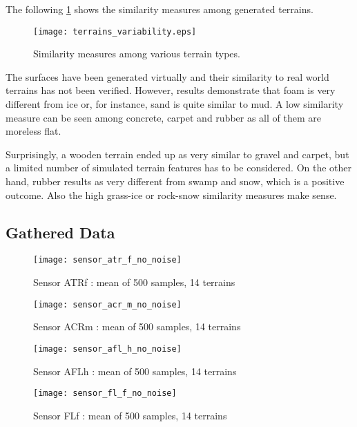The following \cref{fig:terrain_similarity_measures} shows the similarity measures among generated terrains.

\begin{figure}[H]
  \centering
  \texttt{[image: terrains\_variability.eps]}
  \caption{Similarity measures among various terrain types.}
  \label{fig:terrain_similarity_measures}
\end{figure}

The surfaces have been generated virtually and their similarity to real world terrains has not been verified. However, results demonstrate that foam is very different from ice or, for instance, sand is quite similar to mud. A low similarity measure can be seen among concrete, carpet and rubber as all of them are moreless flat.

Surprisingly, a wooden terrain ended up as very similar to gravel and carpet, but a limited number of simulated terrain features has to be considered. 
On the other hand, rubber results as very different from swamp and snow, which is a positive outcome. Also the high grass-ice or rock-snow similarity measures make sense. 

\subsection{Gathered Data} \label{ssec:gathered_data}

\begin{figure}[H]
  \centering
  \texttt{[image: sensor\_atr\_f\_no\_noise]}
  \caption{Sensor ATRf : mean of 500 samples, 14 terrains}
  \label{fig:sensor_atr_f_no_noise}
\end{figure}

\begin{figure}[H]
  \centering
  \texttt{[image: sensor\_acr\_m\_no\_noise]}
  \caption{Sensor ACRm : mean of 500 samples, 14 terrains}
  \label{fig:sensor_acr_m_no_noise}
\end{figure}

\begin{figure}[H]
  \centering
  \texttt{[image: sensor\_afl\_h\_no\_noise]}
  \caption{Sensor AFLh : mean of 500 samples, 14 terrains}
  \label{fig:sensor_afl_h_no_noise}
\end{figure}

\begin{figure}[H]
  \centering
  \texttt{[image: sensor\_fl\_f\_no\_noise]}
  \caption{Sensor FLf : mean of 500 samples, 14 terrains}
  \label{fig:sensor_fl_f_no_noise}
\end{figure}

